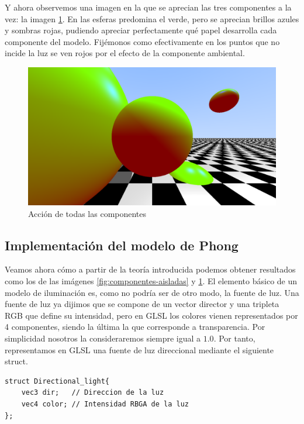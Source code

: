 Y ahora observemos una imagen en la que se aprecian las tres componentes a la vez: la imagen \ref{fig:todas-componentes}. En las esferas predomina el verde, pero se aprecian brillos azules y sombras rojas, pudiendo apreciar perfectamente qué papel desarrolla cada componente del modelo. Fijémonos como efectivamente en los puntos que no incide la luz se ven rojos por el efecto de la componente ambiental.

\begin{figure} [ht]
    \centering
    \includegraphics[scale = 0.23]{img/C7/todas-componentes.png}
    \caption{Acción de todas las componentes}
    \label{fig:todas-componentes}
\end{figure}

\subsection{Implementación del modelo de Phong}

Veamos ahora cómo a partir de la teoría introducida podemos obtener resultados como los de las imágenes \ref{fig:componentes-aisladas} y \ref{fig:todas-componentes}. El elemento básico de un modelo de iluminación es, como no podría ser de otro modo, la fuente de luz. Una fuente de luz ya dijimos que se compone de un vector director y una tripleta RGB que define su intensidad, pero en GLSL los colores vienen representados por 4 componentes, siendo la última la que corresponde a transparencia. Por simplicidad nosotros la consideraremos siempre igual a $1.0$. Por tanto, representamos en GLSL una fuente de luz direccional mediante el siguiente struct.
\begin{lstlisting}
struct Directional_light{
    vec3 dir;   // Direccion de la luz
    vec4 color; // Intensidad RBGA de la luz
};    
\end{lstlisting}

